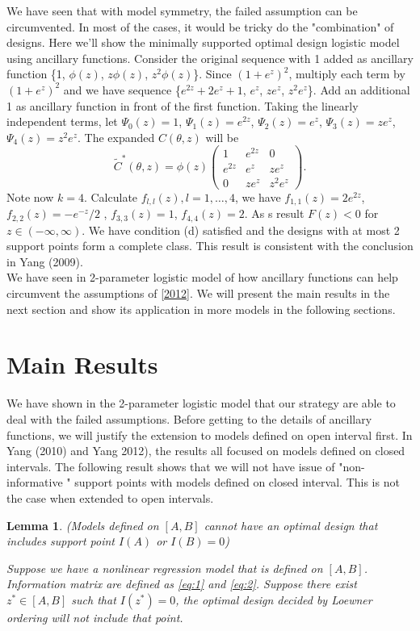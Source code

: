 \documentclass[11pt]{amsart}
\newtheorem{lemma}[theorem]{Lemma}
\theoremstyle{definition}
\theoremstyle{remark}
\begin{document}
 We have seen that with model symmetry, the failed assumption can be circumvented. In most of the cases, it would be tricky do the "combination" of designs. Here we'll show the minimally supported optimal design logistic model using ancillary functions. Consider the original sequence with 1 added as ancillary function \{1, $\phi(z)$, $z\phi(z)$, $z^2\phi(z)$\}. Since $(1+e^{z})^2$, multiply each term by $(1+e^{z})^2$ and we have sequence \{$e^{2z}+2e^z+1$, $e^z$, $ze^z$, $z^2e^z$\}. Add an additional 1 as ancillary function in front of the first function. Taking the linearly independent terms, let $\Psi_0(z) = 1$,  $\Psi_1(z) = e^{2z}$,  $\Psi_2(z) = e^z$, $\Psi_3(z) = ze^z$,$\Psi_4(z) = z^2e^z$. The expanded $C(\theta,z)$ will be \[ \tilde{C}^*(\theta,z) = \phi(z)\left(\begin{array}{ccc}
1 &e^{2z}&0\\
e^{2z}&e^z & ze^z\\
0& ze^z & z^2e^z
\end{array} \right).\]Note now $k=4$. Calculate $f_{l,l}(z), l=1,\ldots, 4$, we have $f_{1,1}(z) = 2e^{2z}$, $f_{2,2}(z) = -e^{-z}/2$ , $f_{3,3}(z) = 1$, $f_{4,4}(z) = 2$. As s result $F(z)<0$ for $z\in (-\infty, \infty)$. We have condition (d) satisfied and the designs with at most 2 support points form a complete class. This result is consistent with the conclusion in Yang (2009). \\
 
 We have seen in 2-parameter logistic model of how ancillary functions can help circumvent the assumptions of \ref{2012}. We will present the main results in the next section and show its application in more models in the following sections.

\section{Main Results}
We have shown in the 2-parameter logistic model that our strategy are able to deal with the failed assumptions. Before getting to the details of ancillary functions, we will justify the extension to models defined on open interval first. In Yang (2010) and Yang 2012), the results all focused on models defined on closed intervals. The following result shows that we will not have issue of "non-informative " support points with models defined on closed interval. This is not the case when extended to open intervals. 

\begin{lemma}(Models defined on $[A,B]$ cannot have an optimal design that includes support point $I(A)$ or $I(B) =0$)

Suppose we have a nonlinear regression model that is defined on $[A,B]$. Information matrix are defined as \eqref{eq:1} and \eqref{eq:2}. Suppose there exist $z^*\in [A,B]$ such that $I(z^*)=0$, the optimal design decided by Loewner ordering will not include that point.
\end{lemma}
\end{document}
